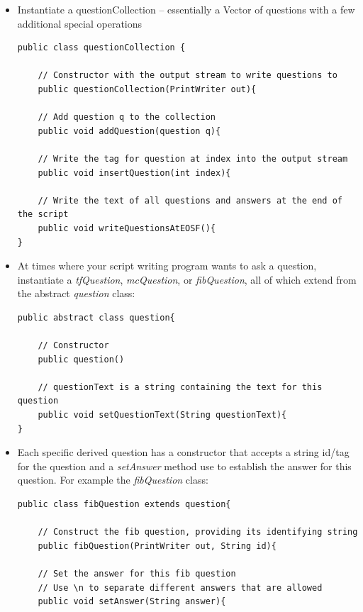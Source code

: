 \documentclass[12pt]{article}
\begin{document}
\begin{itemize}
\item Instantiate a questionCollection -- essentially a Vector of questions with a few additional special operations

\small
\begin{verbatim}
public class questionCollection {
    
    // Constructor with the output stream to write questions to
    public questionCollection(PrintWriter out){

    // Add question q to the collection
    public void addQuestion(question q){

    // Write the tag for question at index into the output stream
    public void insertQuestion(int index){

    // Write the text of all questions and answers at the end of the script
    public void writeQuestionsAtEOSF(){
}
\end{verbatim}

\normalsize  
\item At times where your script writing program wants to ask a
  question, instantiate a \textit{tfQuestion}, \textit{mcQuestion}, or
  \textit{fibQuestion}, all of which extend from the abstract
  \textit{question} class:

\small
\begin{verbatim}
public abstract class question{
    
    // Constructor 
    public question()

    // questionText is a string containing the text for this question
    public void setQuestionText(String questionText){
}
\end{verbatim}
  
\normalsize
\item Each specific derived question has a constructor that accepts a
  string id/tag for the question and a \textit{setAnswer} method use
  to establish the answer for this question.  For example the
  \textit{fibQuestion} class:

\small
\begin{verbatim}
public class fibQuestion extends question{
    
    // Construct the fib question, providing its identifying string
    public fibQuestion(PrintWriter out, String id){

    // Set the answer for this fib question
    // Use \n to separate different answers that are allowed
    public void setAnswer(String answer){


\end{verbatim}
\end{itemize}
\end{document}
